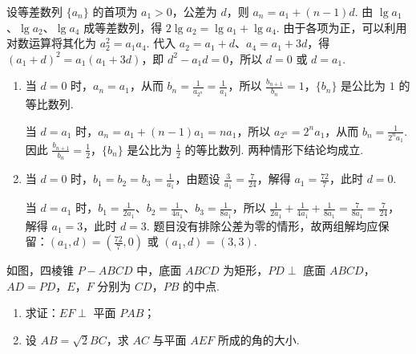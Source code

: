 \begin{solution}
设等差数列 \(\{a_n\}\) 的首项为 \(a_1>0\)，公差为 \(d\)，则 \(a_n=a_1+(n-1)d\). 由 \(\lg a_1\)、\(\lg a_2\)、\(\lg a_4\) 成等差数列，得 \(2\lg a_2=\lg a_1+\lg a_4\). 由于各项为正，可以利用对数运算将其化为 \(a_2^2=a_1a_4\). 代入 \(a_2=a_1+d\)、\(a_4=a_1+3d\)，得 \((a_1+d)^2=a_1(a_1+3d)\)，即 \(d^2-a_1d=0\)，所以 \(d=0\) 或 \(d=a_1\).

\begin{enumerate}
\item 当 \(d=0\) 时，\(a_n=a_1\)，从而 \(b_n=\frac1{a_{2^n}}=\frac1{a_1}\)，所以 \(\frac{b_{n+1}}{b_n}=1\)，\(\{b_n\}\) 是公比为 \(1\) 的等比数列.

当 \(d=a_1\) 时，\(a_n=a_1+(n-1)a_1=na_1\)，所以 \(a_{2^n}=2^na_1\)，从而 \(b_n=\frac1{2^na_1}\). 因此 \(\frac{b_{n+1}}{b_n}=\frac12\)，\(\{b_n\}\) 是公比为 \(\frac12\) 的等比数列. 两种情形下结论均成立.
\item 当 \(d=0\) 时，\(b_1=b_2=b_3=\frac1{a_1}\)，由题设 \(\frac3{a_1}=\frac7{24}\)，解得 \(a_1=\frac{72}{7}\)，此时 \(d=0\).

当 \(d=a_1\) 时，\(b_1=\frac1{2a_1}\)、\(b_2=\frac1{4a_1}\)、\(b_3=\frac1{8a_1}\)，所以 \(\frac1{2a_1}+\frac1{4a_1}+\frac1{8a_1}=\frac7{8a_1}=\frac7{24}\)，解得 \(a_1=3\)，此时 \(d=3\). 题目没有排除公差为零的情形，故两组解均应保留：\((a_1,d)=\left(\frac{72}{7},0\right)\) 或 \((a_1,d)=(3,3)\).
\end{enumerate}
\end{solution}

\begin{problem}
如图，四棱锥 \(P - ABCD\) 中，底面 \(ABCD\) 为矩形，\(PD \perp\) 底面 \(ABCD\)，\(AD = PD\)，\(E\)，\(F\) 分别为 \(CD\)，\(PB\) 的中点.

\begin{enumerate}
\item 求证：\(EF \perp\) 平面 \(PAB\)；
\item 设 \(AB = \sqrt{2}BC\)，求 \(AC\) 与平面 \(AEF\) 所成的角的大小.
\end{enumerate}

\end{problem}

